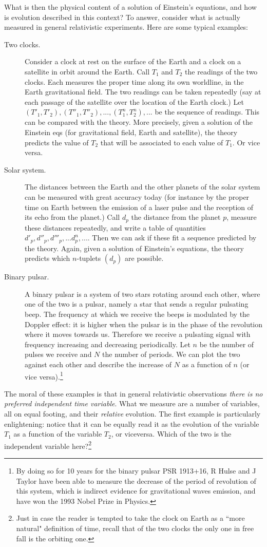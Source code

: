 \documentclass[10pt,nofootinbib]{revtex4}
\begin{document}
What is then the physical content of a solution of Einstein's equations, and how is evolution described in this context?  To answer, consider what is actually measured in general relativistic experiments.  Here are some typical examples:
\begin{description}
\item[Two clocks.]  Consider a clock at rest on the surface of the Earth and a clock on a satellite in orbit around the Earth. Call $T_1$ and $T_2$ the readings of the two clocks.  Each measures the proper time along its own worldline, in the Earth gravitational field.  The two readings can be taken repeatedly (say at each passage of the satellite over the location of the Earth clock.)  Let $(T'_1,T'_2), (T''_1,T''_2),..., (T^n_1,T^n_2), ... $ be the sequence of readings.   This can be compared with the theory.   More precisely, given a solution of the Einstein eqs (for gravitational field, Earth and satellite), the theory predicts the value of $T_2$ that will be associated to each value of $T_1$. Or vice versa. 
\item[Solar system.] The distances between the Earth and the other planets of the solar system can be measured with great accuracy today (for instance by the proper time on Earth between the emission of a laser pulse and the reception of its echo from the planet.) Call $d_p$ the distance from the planet $p$, measure these distances repeatedly, and write a table of quantities  $d'_p, d''_p, d'''_p, ... d^n_p, ... $. Then we can ask if these fit a sequence predicted by the theory. Again, given a solution of Einstein's equations, the theory predicts which $n$-tuplets $(d_p)$ are possible. 
\item[Binary pulsar.] A binary pulsar is a system of two stars rotating around each other, where one of the two is a pulsar, namely a star that sends a regular pulsating beep. The frequency at which we receive the beeps is modulated by the Doppler effect: it is higher when the pulsar is in the phase of the revolution where it moves towards us.  Therefore we receive a pulsating signal with  frequency increasing and decreasing periodically.  Let $n$ be the number of pulses we receive and $N$ the number of periods.   We can plot the two against each other and describe the increase of $N$ as a function of $n$ (or vice versa).\footnote{By doing so for 10 years for the binary pulsar PSR 1913+16, R Hulse and J Taylor have been able to measure the decrease of the period of revolution of this system, which is indirect evidence for gravitational waves emission, and have won the 1993 Nobel Prize in Physics.}
\end{description}
The moral of these examples is that in general relativistic observations {\em there is no preferred independent time variable}.   What we measure are a number of variables, all on equal footing, and their \emph{relative} evolution.   The first example is particularly enlightening:  notice that it can be equally read it as the evolution of the variable $T_1$ as a function of the variable $T_2$, or viceversa.  Which of the two is the independent variable here?\footnote{Just in case the reader is tempted to take the clock on Earth as a ``more natural" definition of time, recall that of the two clocks the only one in free fall is the orbiting one.}
\end{document}
